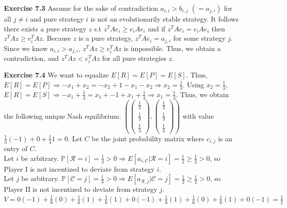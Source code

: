 \documentclass[10pt]{article}[H]
\begin{document}
\begin{itemize}
    \item [\textbf{Exercise 7.3}] Assume for the sake of contradiction $a_{i,i}>b_{i,j}$ $(=a_{j,i})$ for all $j\neq i$ and pure strategy $i$ is not an evolutionarily stable strategy. 
    It follows there exists a pure strategy $z$ s.t $z^T A e_i\ge e_i A e_i$ and if $z^T A e_i=e_i A e_i$ then $z^T A z\ge e_i^T A z$. Because $z$ is a pure strategy, $z^T A e_i=a_{j,i}$ for some strategy $j$. 
    Since we know $a_{i,i}>a_{j,i}$, $z^T A z\ge e_i^T A z$ is impossible. Thus, we obtain a contradiction, and $z^T A z< e_i^T A z$ for all pure strategies $z$.
    \item [\textbf{Exercise 7.4}] We want to equalize $E[R]=E[P]=E[S]$. Thus, $E[R]=E[P]\Rightarrow -x_1+x_2=-x_2+1-x_1-x_2 \Rightarrow x_2=\frac{1}{3}$. Using $x_2=\frac{1}{3}$, $E[R]=E[S]\Rightarrow -x_1+\frac{1}{3}=x_1+-1+x_1+\frac{1}{3}\Rightarrow x_1=\frac{1}{3}$. 
    Thus, we obtain the following unique Nash equilibrium: $(\begin{pmatrix}
       \frac{1}{3}\\
       \frac{1}{3}\\
       \frac{1}{3} 
    \end{pmatrix},\begin{pmatrix}
        \frac{1}{3}\\
        \frac{1}{3}\\
        \frac{1}{3} 
     \end{pmatrix})$ with value $\frac{1}{3}(-1)+0+\frac{1}{3}1=0$. Let $C$ be the joint probability matrix where $c_{i,j}$ is an entry of $C$.\\ 
     Let $i$ be arbitrary. $\mathbb{P}[\mathcal{R}=i]=\frac{1}{3}>0\Rightarrow E[a_{i,\mathcal{C}}|\mathcal{R}=i]=\frac{1}{2}\ge\frac{1}{2}>0$, so Player I is not incentized to deviate from strategy $i$.\\
     Let $j$ be arbitrary. $\mathbb{P}[\mathcal{C}=j]=\frac{1}{3}>0\Rightarrow E[a_{\mathcal{R},j}|\mathcal{C}=j]=\frac{1}{2}\ge\frac{1}{2}>0$, so Player II is not incentized to deviate from strategy $j$.\\
     $V=0(-1)+\frac{1}{6}(0)+\frac{1}{6}(1)+\frac{1}{6}(1)+0(-1)+\frac{1}{6}(1)+\frac{1}{6}(0)+\frac{1}{6}(1)+0(-1)=\frac{1}{2}$


\end{itemize}
\end{document}
